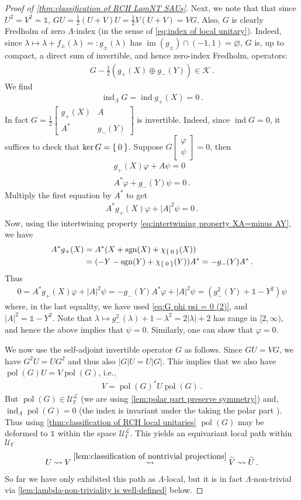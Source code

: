 \documentclass[a4paper,10pt]{article}
\numberwithin{equation}{section}
\theoremstyle{plain}
\theoremstyle{plain}
\theoremstyle{plain}
\theoremstyle{plain}
\theoremstyle{plain}
\theoremstyle{remark}
\theoremstyle{definition}
\theoremstyle{plain}
\newcommand{\FF}{\mathbb{F}}
\newcommand{\calU}{\mathcal{U}}
\newcommand{\calK}{\mathcal{K}}
\newcommand{\calL}{\mathcal{L}}
\newcommand{\ti}[1]{\widetilde{#1}}
\newcommand{\vf}{\varphi}
\newcommand{\Id}{\mathds{1}}
\newcommand{\sgn}{\operatorname{sgn}}
\newcommand{\findex}{\operatorname{ind}}
\newcommand{\im}{\operatorname{im}}
\newcommand{\eq}[1]{\begin{align*}#1\end{align*}}
\newcommand{\eql}[1]{\begin{align}#1\end{align}}
\newcommand{\polar}{\operatorname{pol}}
\begin{document}
\begin{proof}[Proof of \cref{thm:classification of RCH LamNT SAUs}]
		Next, we note that that since $U^2=V^2=\Id$, $GU=\frac{1}{2}(U+V)U=\frac{1}{2}V(U+V)=VG$. Also, $G$ is clearly Fredholm of zero $\Lambda$-index (in the sense of \cref{eq:index of local unitary}). Indeed, since $\lambda\mapsto\lambda+f_\pm(\lambda)=:g_\pm(\lambda)$ has $\im(g_\pm)\cap(-1,1)=\varnothing$, $G$ is, up to compact, a direct sum of invertible, and hence zero-index Fredholm, operators: \eq{G - \frac{1}{2}\left( g_+(X)\oplus g_-(Y)\right) \in\calK\,.} We find \eq{\findex_\Lambda G = \findex g_+(X) = 0\,.}
		In fact $G=\frac12\begin{bmatrix} g_+(X) & A \\ A^\ast &  g_-(Y)\end{bmatrix}$ is invertible. Indeed, since $\findex G=0$, it suffices to check that ${\ker G=\Set{0}}$. Suppose $G \begin{bmatrix}\vf \\ \psi\end{bmatrix}=0$, then \eql{\label{eq:G phi psi = 0 (1)}g_+(X)\vf + A\psi = 0 \\ \label{eq:G phi psi = 0 (2)}A^*\vf + g_-(Y)\psi = 0\,.}
		Multiply the first equation by $A^*$ to get \eq{A^* g_+(X)\vf + |A|^2\psi = 0\,.} Now, using the intertwining property \cref{eq:intertwining property XA=minus AY}, we have \eq{A^*g_+(X) &= A^*(X + \sgn(X)+\chi_{\Set{0}}(X)) \\ &= (-Y-\sgn(Y) + \chi_{\Set{0}}(Y))A^* = -g_-(Y)A^*\,.} 
		Thus \eq{0=A^* g_+(X)\vf + |A|^2\psi=-g_-(Y)A^*\vf+|A|^2\psi = (g_-^2(Y)+\Id-Y^2)\psi} where, in the last equality, we have used \cref{eq:G phi psi = 0 (2)}, and $|A|^2=\Id-Y^2.$ Note that $\lambda\mapsto g_-^2(\lambda) + 1-\lambda^2 = 2|\lambda|+2$ has range in $[2,\infty)$, and hence the above implies that $\psi=0.$ Similarly, one can show that $\vf=0.$
		
		We now use the self-adjoint invertible operator $G$ as follows. Since $GU = VG$, we have $G^2 U = U G^2$ and thus also $|G| U = U |G|$. This implies that we also have $\polar(G) U = V \polar(G)$, i.e., \eql{\label{eq:V and U intertwines} V = \polar(G)^\ast U \polar(G)\,.} But $\polar(G)\in\calU^\calL_\FF$ (we are using \cref{lem:polar part preserve symmetry}) and, $\findex_\Lambda \polar(G) = 0$ (the index is invariant under the taking the polar part \cite[Lemma 6]{Graf_Shapiro_2018_1D_Chiral_BEC}). Thus using \cref{thm:classification of RCH local unitaries} $\polar(G)$ may be deformed to $\Id$ within the space $\calU^\calL_\FF$. This yields an equivariant local path within $\calU_\FF$ \eq{U \rightsquigarrow V \overset{\mathrm{\cref{lem:classification of nontrivial projections}}}{\rightsquigarrow} \ti{V}\rightsquigarrow \ti{U}\,.} So far we have only exhibited this path as $\Lambda$-local, but it is in fact  $\Lambda$-non-trivial via \cref{lem:lambda-non-triviality is well-defined} below. 
		
	\end{proof}
	
\end{document}
